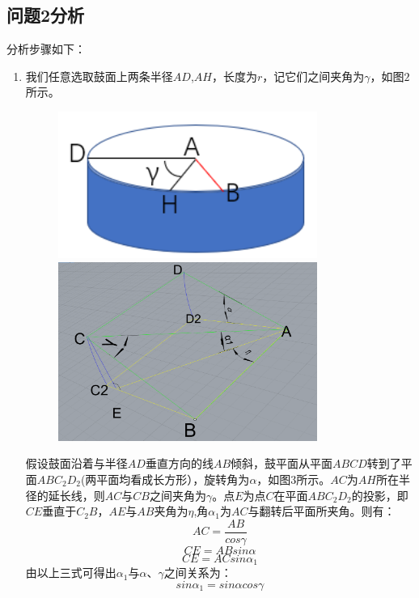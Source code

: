 \documentclass{cumcm}
\begin{document}
\subsection{问题2分析}
分析步骤如下：
\begin{enumerate}
\item 我们任意选取鼓面上两条半径$AD$,$AH$，长度为$r$，记它们之间夹角为$\gamma$，如图$2$所示。
\begin{figure}[H]
  \begin{minipage}[t]{0.5\linewidth}   
    \centering   
    \includegraphics[width=0.8\textwidth]{img/circle.png}   
    \caption{}
  \end{minipage}   
   \begin{minipage}[t]{0.5\linewidth} 
      \centering   
      \includegraphics[width=0.8\textwidth]{img/change.png} 
      \caption{}      
    \end{minipage} 
\end{figure}
假设鼓面沿着与半径$AD$垂直方向的线$AB$倾斜，鼓平面从平面$ABCD$转到了平面$ABC_2D_2$(两平面均看成长方形），旋转角为$\alpha$，如图$3$所示。$AC$为$AH$所在半径的延长线，则$AC$与$CB$之间夹角为$\gamma$。点$E$为点$C$在平面$ABC_2D_2$的投影，即$CE$垂直于$C_2B$，$AE$与$AB$夹角为$\eta$,角$\alpha_1$为$AC$与翻转后平面所夹角。则有：\\
\begin{displaymath}
AC=\frac{AB}{cos\gamma}
\end{displaymath}
\begin{displaymath}
CE=ABsin\alpha
\end{displaymath}
\begin{displaymath}
CE=ACsin\alpha_1
\end{displaymath}
由以上三式可得出$\alpha_1$与$\alpha$、$\gamma$之间关系为：
\begin{equation}
sin\alpha_1=sin\alpha cos\gamma
\end{equation}


\end{enumerate}
\end{document}
